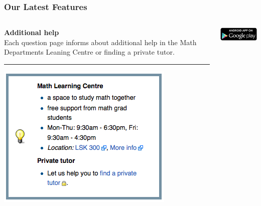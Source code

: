 \documentclass{beamer}
\begin{document}
\frame
{\frametitle{\bf{Our Latest Features}}
\begin{columns}
\begin{column}{0.33\textwidth}
{\bf \color{blue} Additional help}\\[.25cm]
Each question page informs about additional help in the Math Departments Leaning Centre or finding a private tutor.
\medskip
\hrule
\bigskip

\includegraphics[width=\textwidth]{additional_help.png}
\end{column}
\begin{column}{0.33\textwidth}

\vspace{-.1cm}
\begin{center}
\includegraphics[width=.6\textwidth]{en_app_rgb_wo_45.png}


\end{center}
\end{column}
\end{columns}}
\end{document}
